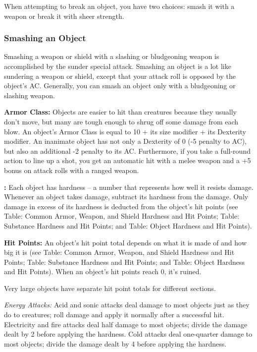 When attempting to break an object, you have two choices: smash it with a weapon 
or break it with sheer strength.

\subsubsection{Smashing an Object}

Smashing a weapon or shield with a slashing or bludgeoning weapon is accomplished 
by the sunder special attack. Smashing an object is a lot like sundering a weapon 
or shield, except that your attack roll is opposed by the object's AC. Generally, 
you can smash an object only with a bludgeoning or slashing weapon.

\textbf{Armor Class:} Objects are easier to hit than creatures because they usually 
don't move, but many are tough enough to shrug off some damage from each blow. 
An object's Armor Class is equal to 10 + its size modifier + its Dexterity modifier. 
An inanimate object has not only a Dexterity of 0 (-5 penalty to AC), but also 
an additional -2 penalty to its AC. Furthermore, if you take a full-round action 
to line up a shot, you get an automatic hit with a melee weapon and a +5 bonus 
on attack rolls with a ranged weapon.

\textbf{:} Each object has hardness -- a number that represents how well 
it resists damage. Whenever an object takes damage, subtract its hardness from 
the damage. Only damage in excess of its hardness is deducted from the object's 
hit points (see Table: Common Armor, Weapon, and Shield Hardness and Hit Points; 
Table: Substance Hardness and Hit Points; and Table: Object Hardness and Hit Points).

\textbf{Hit Points:} An object's hit point total depends on what it is made of 
and how big it is (see Table: Common Armor, Weapon, and Shield Hardness and Hit 
Points; Table: Substance Hardness and Hit Points; and Table: Object Hardness and 
Hit Points). When an object's hit points reach 0, it's ruined.

Very large objects have separate hit point totals for different sections.

\textit{Energy Attacks:} Acid and sonic attacks deal damage to most objects just 
as they do to creatures; roll damage and apply it normally after a successful hit. 
Electricity and fire attacks deal half damage to most objects; divide the damage 
dealt by 2 before applying the hardness. Cold attacks deal one-quarter damage to 
most objects; divide the damage dealt by 4 before applying the hardness.

